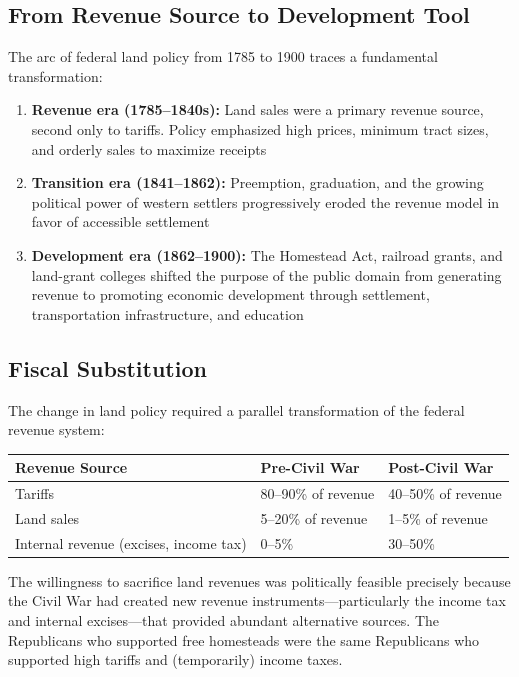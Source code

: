 \documentclass[12pt]{article}
\begin{document}
\subsection{From Revenue Source to Development Tool}

The arc of federal land policy from 1785 to 1900 traces a fundamental transformation:

\begin{enumerate}
\item \textbf{Revenue era (1785--1840s):} Land sales were a primary revenue source, second only to tariffs.  Policy emphasized high prices, minimum tract sizes, and orderly sales to maximize receipts
\item \textbf{Transition era (1841--1862):} Preemption, graduation, and the growing political power of western settlers progressively eroded the revenue model in favor of accessible settlement
\item \textbf{Development era (1862--1900):} The Homestead Act, railroad grants, and land-grant colleges shifted the purpose of the public domain from generating revenue to promoting economic development through settlement, transportation infrastructure, and education
\end{enumerate}

\subsection{Fiscal Substitution}

The change in land policy required a parallel transformation of the federal revenue system:

\begin{center}
\begin{tabular}{lll}
\toprule
Revenue Source & Pre-Civil War & Post-Civil War \\
\midrule
Tariffs & 80--90\% of revenue & 40--50\% of revenue \\
Land sales & 5--20\% of revenue & 1--5\% of revenue \\
Internal revenue (excises, income tax) & 0--5\% & 30--50\% \\
\bottomrule
\end{tabular}
\end{center}

The willingness to sacrifice land revenues was politically feasible precisely because the Civil War had created new revenue instruments---particularly the income tax and internal excises---that provided abundant alternative sources.  The Republicans who supported free homesteads were the same Republicans who supported high tariffs and (temporarily) income taxes.
\end{document}
